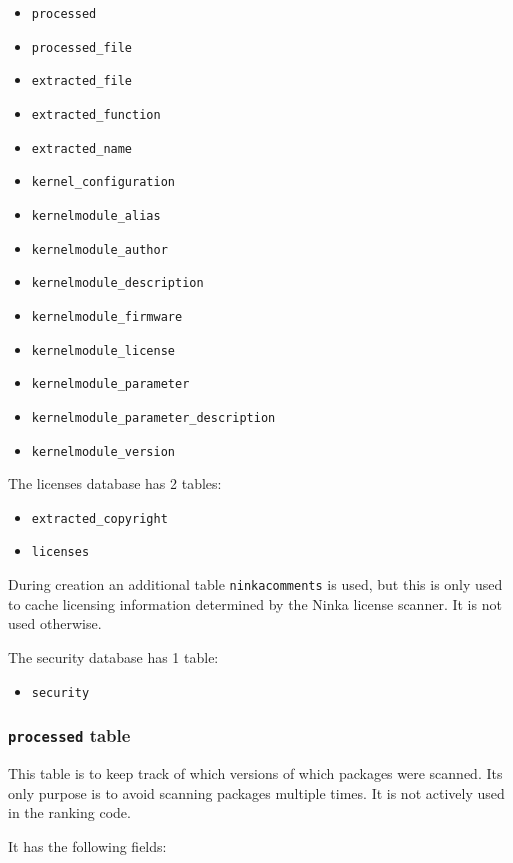 \documentclass[10pt]{article}
\begin{document}
\begin{itemize}
\item \texttt{processed}
\item \texttt{processed\_file}
\item \texttt{extracted\_file}
\item \texttt{extracted\_function}
\item \texttt{extracted\_name}
\item \texttt{kernel\_configuration}
\item \texttt{kernelmodule\_alias}
\item \texttt{kernelmodule\_author}
\item \texttt{kernelmodule\_description}
\item \texttt{kernelmodule\_firmware}
\item \texttt{kernelmodule\_license}
\item \texttt{kernelmodule\_parameter}
\item \texttt{kernelmodule\_parameter\_description}
\item \texttt{kernelmodule\_version}
\end{itemize}

The licenses database has 2 tables:

\begin{itemize}
\item \texttt{extracted\_copyright}
\item \texttt{licenses}
\end{itemize}

During creation an additional table \texttt{ninkacomments} is used, but this
is only used to cache licensing information determined by the Ninka license
scanner. It is not used otherwise.

The security database has 1 table:

\begin{itemize}
\item \texttt{security}
\end{itemize}

\subsubsection{\texttt{processed} table}

This table is to keep track of which versions of which packages were scanned.
Its only purpose is to avoid scanning packages multiple times. It is not
actively used in the ranking code.

It has the following fields:
\end{document}

